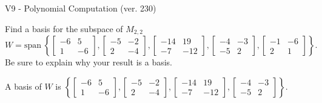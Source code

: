 \begin{exercise}
  \begin{exerciseTitle}V9 - Polynomial Computation (ver. 230)\end{exerciseTitle}
  \begin{exerciseStatement}
    Find a basis for the subspace of \(M_{2,2}\) 
\[W=\mathrm{span}\ \left\{\left[\begin{array}{cc}
-6 & 5 \\
1 & -6
\end{array}\right] , \left[\begin{array}{cc}
-5 & -2 \\
2 & -4
\end{array}\right] , \left[\begin{array}{cc}
-14 & 19 \\
-7 & -12
\end{array}\right] , \left[\begin{array}{cc}
-4 & -3 \\
-5 & 2
\end{array}\right] , \left[\begin{array}{cc}
-1 & -6 \\
2 & 1
\end{array}\right]\right\}.\]
 Be sure to explain why your result is a basis.


  \end{exerciseStatement}
  \begin{exerciseAnswer}
   A basis of \(W\) is  \(\left\{\left[\begin{array}{cc}
-6 & 5 \\
1 & -6
\end{array}\right] , \left[\begin{array}{cc}
-5 & -2 \\
2 & -4
\end{array}\right] , \left[\begin{array}{cc}
-14 & 19 \\
-7 & -12
\end{array}\right] , \left[\begin{array}{cc}
-4 & -3 \\
-5 & 2
\end{array}\right]\right\}\).
  


  \end{exerciseAnswer}
\end{exercise}